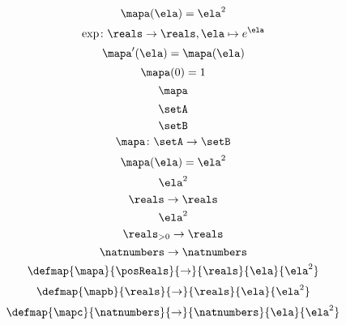 \begin{forslides}
    \begin{equation}
        \label{eq:slides_session2_76}
        \mapa(\ela)=\ela^2
    \end{equation}
    \begin{equation}
        \label{eq:slides_session2_77}
        \exp \colon \reals \to \reals, \ela \mapsto e^\ela
    \end{equation}
    \begin{equation}
        \label{eq:slides_session2_78}
        \mapa'(\ela) = \mapa(\ela)
    \end{equation}
    \begin{equation}
        \label{eq:slides_session2_79}
        \mapa(0) =1
    \end{equation}
    \begin{equation}
        \label{eq:slides_session2_80}
        \mapa
    \end{equation}
    \begin{equation}
        \label{eq:slides_session2_81}
        \setA
    \end{equation}
    \begin{equation}
        \label{eq:slides_session2_82}
        \setB
    \end{equation}
    \begin{equation}
        \label{eq:slides_session2_83}
        \mapa\colon \setA \to \setB
    \end{equation}
    \begin{equation}
        \label{eq:slides_session2_84}
        \mapa(\ela)=\ela^2
    \end{equation}
    \begin{equation}
        \label{eq:slides_session2_85}
        \ela^2
    \end{equation}
    \begin{equation}
        \label{eq:slides_session2_86}
        \reals \to \reals
    \end{equation}
    \begin{equation}
        \label{eq:slides_session2_87}
        \ela^2
    \end{equation}
    \begin{equation}
        \label{eq:slides_session2_88}
        \reals_{> 0} \to \reals
    \end{equation}
    \begin{equation}
        \label{eq:slides_session2_89}
        \natnumbers \to \natnumbers
    \end{equation}
    \begin{equation}
        \label{eq:slides_session2_90}
        \defmap{\mapa}{\posReals}{\to}{\reals}{\ela}{\ela^2}
    \end{equation}
    \begin{equation}
        \label{eq:slides_session2_91}
        \defmap{\mapb}{\reals}{\to}{\reals}{\ela}{\ela^2}
    \end{equation}
    \begin{equation}
        \label{eq:slides_session2_92}
        \defmap{\mapc}{\natnumbers}{\to}{\natnumbers}{\ela}{\ela^2}
    \end{equation}


\end{forslides}
